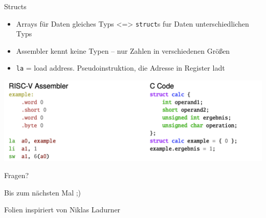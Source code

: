 \documentclass[
  german,            %
  aspectratio=169,    %
]{tumbeamer}
\begin{document}
\begin{frame}[c]{Structs}{}
  \begin{itemize}
    \item Arrays für Daten gleiches Typs <=> \texttt{struct}s fur Daten unterschiedlichen Typs 
    \item Assembler kennt keine Typen -- nur Zahlen in verschiedenen Größen
    \item \texttt{la} = load address. Pseudoinstruktion, die Adresse in Register ladt
  \end{itemize}
  \vspace{0.4cm}
  \includegraphics[width=\linewidth]{strutcs_comparison.png}
\end{frame} 



\begin{frame}[c]{}{}
  \begin{center}
    \LARGE Fragen?
  \end{center}
  \vspace{0.5cm}
  \begin{center}
    \LARGE Bis zum nächsten Mal ;) \\
  \end{center}
  \vspace{1.0cm}
  \begin{center}
    \small Folien inspiriert von Niklas Ladurner
  \end{center}
\end{frame}
\end{document}
